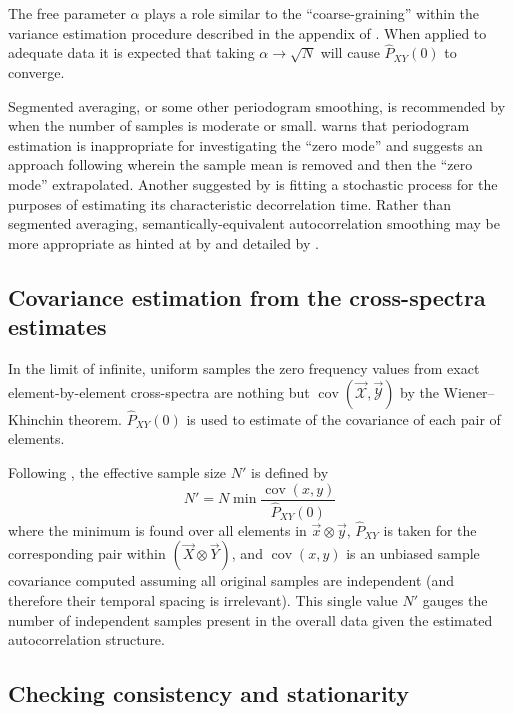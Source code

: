\documentclass[letterpaper,11pt,nointlimits,reqno]{amsart}
\DeclareMathOperator{\cov}{cov}
\begin{document}
The free parameter $\alpha$ plays a role similar to the ``coarse-graining''
within the variance estimation procedure described in the appendix of
\citet{Hoyas2008Reynolds}.  When applied to adequate data it is expected that
taking $\alpha\to\sqrt{N}$ will cause $\hat{P}_{XY}(0)$ to converge.

Segmented averaging, or some other periodogram smoothing, is recommended by
\citet[\textsection{}17.1.3]{Storch2001Statistical} when the number of samples
is moderate or small.  \citet[\textsection{}12.3.7]{Storch2001Statistical}
warns that periodogram estimation is inappropriate for investigating the ``zero
mode'' and suggests an approach following \citet{Madden1976Estimates} wherein
the sample mean is removed and then the ``zero mode'' extrapolated.  Another
suggested by \citet[\textsection{}17.1.3]{Storch2001Statistical} is fitting a
stochastic process for the purposes of estimating its characteristic
decorrelation time.  Rather than segmented averaging, semantically-equivalent
autocorrelation smoothing may be more appropriate as hinted at by
\citet{Scargle1982Studies} and detailed by \citet{Richards1967Computing}.

\subsection*{Covariance estimation from the cross-spectra estimates}

In the limit of infinite, uniform samples the zero frequency values from exact
element-by-element cross-spectra are nothing but $\cov\left( \vec{\mathscr{X}}
, \vec{\mathscr{Y}} \right)$ by the Wiener--Khinchin theorem.
$\hat{P}_{XY}(0)$ is used to estimate of the covariance of each pair of
elements.

Following \citet{Thiebaux1984Interpretation}, the effective sample size $N'$ is
defined by
$$
    N' = N \min \frac{\cov(x,y)} {\hat{P}_{XY}(0)}
$$
where the minimum is found over all elements in $\vec{x}\otimes\vec{y}$,
$\hat{P}_{XY}$ is taken for the corresponding pair within $\left(\vec{X}
\otimes \vec{Y} \right)$, and $\cov(x,y)$ is an unbiased sample covariance
computed assuming all original samples are independent (and therefore their
temporal spacing is irrelevant).  This single value $N'$ gauges the number of
independent samples present in the overall data given the estimated
autocorrelation structure.

\subsection*{Checking consistency and stationarity}
\end{document}
